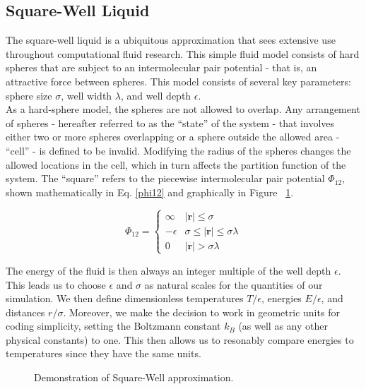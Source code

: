 \documentclass[12pt]{article}
\renewcommand{\vec}[1]{\mathbf{#1}}
\begin{document}
\subsection{Square-Well Liquid}
The square-well liquid is a ubiquitous approximation that sees extensive use throughout computational fluid research. This simple fluid model consists of hard spheres that are subject to an intermolecular pair potential - that is, an attractive force between spheres. This model consists of several key parameters: sphere size $\sigma$, well width $\lambda$, and well depth $\epsilon$. \\
 As a hard-sphere model, the spheres are not allowed to overlap. Any arrangement of spheres - hereafter referred to as the ``state'' of the system - that involves either two or more spheres overlapping or a sphere outside the allowed area - ``cell'' - is defined to be invalid. Modifying the radius of the spheres changes the allowed locations in the cell, which in turn affects the partition function of the system. The ``square'' refers to the piecewise intermolecular pair potential $\Phi_{12}$, shown mathematically in Eq. \ref{phi12} and graphically in Figure ~\ref{sw_phi}.

\begin{equation} 
\Phi_{12} = \begin{cases}\infty & |\vec{r}|\leq \sigma\\ -\epsilon & \sigma \leq |\vec{r}| \leq \sigma\lambda\\ 0 & |\vec{r}| > \sigma\lambda \end{cases}
\label{phi12}
\end{equation}

The energy of the fluid is then always an integer multiple of the well depth $\epsilon$. This leads us to choose $\epsilon$ and $\sigma$ as natural scales for the quantities of our simulation. We then define dimensionless temperatures $T/\epsilon$, energies $E/\epsilon$, and distances $r/\sigma$. Moreover, we make the decision to work in geometric units for coding simplicity, setting the Boltzmann constant $k_B$ (as well as any other physical constants) to one. This then allows us to resonably compare energies to temperatures since they have the same units.

\begin{figure}
    \centering
    \caption{Demonstration of Square-Well approximation.}
    \label{sw_phi}
\end{figure}
\end{document}
